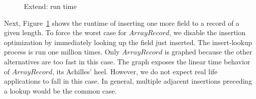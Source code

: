 \documentclass[natbib]{sigplanconf}
\newcommand{\Conid}[1]{\mathit{#1}}
\begin{document}
\begin{figure}[t]
\begin{center}
\end{center}
\caption{Extend: run time}
\label{extend_time}
\end{figure}


Next, Figure~\ref{extend_time} shows the runtime of inserting one more
field to a record of a given length.
To force the worst case for \ensuremath{\Conid{ArrayRecord}}, we disable the insertion optimization by immediately looking up the field just inserted.
The insert-lookup process is run one million times.
Only \ensuremath{\Conid{ArrayRecord}} is graphed because the other alternatives are too fast in this case.
The graph exposes the linear time behavior of \ensuremath{\Conid{ArrayRecord}}, its Achilles' heel.
However, we do not expect real life applications to fall in this case.
In general, multiple adjacent insertions preceding a lookup would be the common case. 
\end{document}
